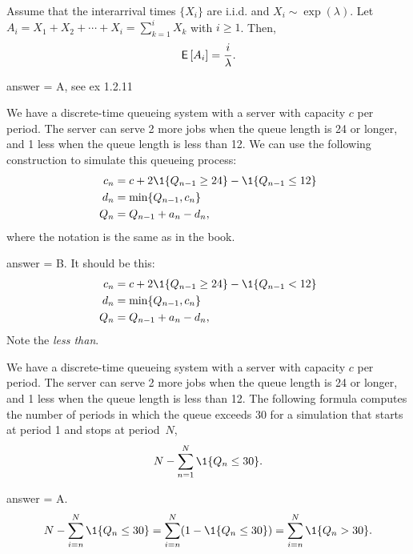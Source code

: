 \begin{exercise}[201804]
    Assume that the interarrival times $\{X_i\}$ are i.i.d. and
    $X_i\sim\exp(\lambda)$. Let
    $A_i=X_1+X_2+\cdots+X_i=\sum_{k=1}^i X_k$ with $i\geq 1$. Then,
 \begin{equation*}
\,\mathsf{E}\left[A_i\right] = \frac i\lambda.
 \end{equation*}
\begin{solution}
answer = A, see ex 1.2.11
\end{solution}
\end{exercise}

\begin{exercise}[201804]
We have a discrete-time queueing system with a server with capacity $c$ per period. The server can serve 2 more jobs
when the queue length is 24 or longer, and  1 less when the queue length is less than 12.  
We can use the following construction  to simulate this queueing process:
\begin{align*}
c_n &= c + 2\1{Q_{n-1} \geq 24} - \1{Q_{n-1} \leq 12}\\
  d_n &= \min\{Q_{n-1}, c_n\} \\
Q_n &= Q_{n-1} + a_n - d_n,
\end{align*}
where the notation is the same as in the book.
\begin{solution}
answer = B. It should be this:
\begin{align*}
c_n &= c + 2\1{Q_{n-1} \geq 24} - \1{Q_{n-1} < 12}\\
  d_n &= \min\{Q_{n-1}, c_n\} \\
Q_n &= Q_{n-1} + a_n - d_n,
\end{align*}
Note the \emph{less than}.
\end{solution}
\end{exercise}

\begin{exercise}[201804]
We have a discrete-time queueing system with a server with capacity $c$ per period. The server can serve 2 more jobs
when the queue length is 24 or longer, and  1 less when the queue length is less than 12.  
The following formula computes the number of periods in which the queue exceeds 30 for a simulation that starts at period 1 and stops at period~$N$, 
\begin{equation*}
N-  \sum_{n=1}^N \1{Q_n \leq 30}.
\end{equation*}
\begin{solution}
answer = A. 
\begin{equation*}
N-  \sum_{i=n}^N \1{Q_n \leq 30} = 
\sum_{i=n}^N (1-\1{Q_n \leq 30}) = 
\sum_{i=n}^N \1{Q_n > 30}.
\end{equation*}
\end{solution}
\end{exercise}

